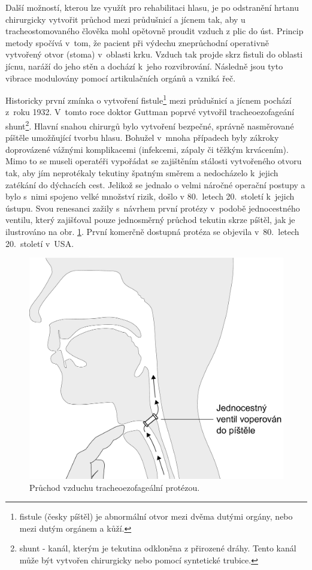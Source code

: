 Další možností, kterou lze využít pro rehabilitaci hlasu, je po odstranění hrtanu chirurgicky vytvořit průchod
mezi průdušnicí a jícnem tak, aby u tracheostomovaného člověka mohl opětovně proudit vzduch z plic do úst.
Princip metody spočívá v~tom, že pacient při výdechu zneprůchodní operativně vytvořený otvor (stoma) v~oblasti krku. Vzduch tak projde skrz fistuli do oblasti jícnu, naráží do jeho stěn a dochází  k~jeho rozvibrování. Následně jsou tyto vibrace modulovány pomocí artikulačních orgánů a vzniká řeč.

Historicky první zmínka o vytvoření fistule\footnote{fistule (česky píštěl) je abnormální
otvor mezi dvěma dutými orgány, nebo mezi dutým orgánem a kůží.} mezi
průdušnicí a jícnem pochází z~roku 1932. V~tomto roce doktor Guttman poprvé
vytvořil tracheoezofageání shunt\footnote{shunt - kanál, kterým je tekutina
odkloněna z přirozené dráhy. Tento kanál může být vytvořen chirurgicky nebo pomocí syntetické trubice. }.
Hlavní snahou chirurgů bylo vytvoření bezpečné, správně nasměrované píštěle
umožňující tvorbu hlasu. Bohužel v~mnoha případech byly zákroky doprovázené
vážnými komplikacemi (infekcemi, zápaly či těžkým krvácením).
Mimo to se museli operatéři vypořádat se zajištěním stálosti
vytvořeného otvoru tak, aby jím neprotékaly tekutiny špatným směrem a
nedocházelo  k~jejich zatékání do dýchacích cest. Jelikož se jednalo o velmi
náročné operační postupy a bylo s~nimi spojeno velké množství rizik, došlo v
80.~letech 20.~století  k~jejich ústupu. Svou renesanci zažily s~návrhem první protézy v~podobě jednocestného ventilu, který zajišťoval pouze jednosměrný
průchod tekutin skrze píštěl, jak je ilustrováno na obr.
\ref{fig:cause:treatment:shunt}. První komerčně dostupná protéza se objevila
v~80.~letech 20.~století v~USA.

\begin{figure}[htb]
  \begin{center}
    \includegraphics[width=0.6\linewidth]{ch3-cause/figures/te-shunt}
    \caption[Průchod vzduchu tracheoezofageální protézou.]{Průchod vzduchu tracheoezofageální protézou.}
    \label{fig:cause:treatment:shunt}
  \end{center}
\end{figure}


